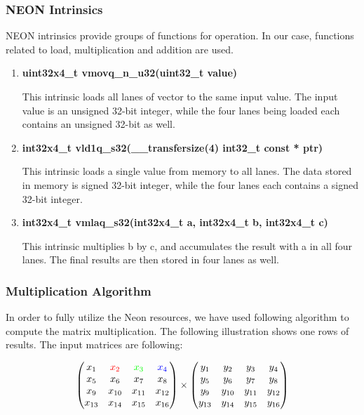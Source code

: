 \subsubsection{NEON Intrinsics}
NEON intrinsics \cite{Intrinsics} provide groups of functions for operation. 
In our case, functions related to load, multiplication and addition are used. 
\begin{enumerate}
\item \textbf{uint32x4\_t  vmovq\_n\_u32(uint32\_t value)}

This intrinsic loads all lanes of vector to the same input value. 
The input value is an unsigned 32-bit integer, 
while the four lanes being loaded each contains an unsigned 32-bit as well.


\item \textbf{int32x4\_t   vld1q\_s32(\_\_transfersize(4) int32\_t const * ptr)}

This intrinsic loads a single value from memory to all lanes.
The data stored in memory is signed 32-bit integer, 
while the four lanes each contains a signed 32-bit integer.

\item \textbf{int32x4\_t   vmlaq\_s32(int32x4\_t a, int32x4\_t b, int32x4\_t c)}

This intrinsic multiplies b by c, and accumulates the result with a in all four lanes.
The final results are then stored in four lanes as well.
\end{enumerate}

\subsubsection{Multiplication Algorithm}

In order to fully utilize the Neon resources, we have used following algorithm to compute the matrix multiplication. The following illustration shows one rows of results.
The input matrices are following:

$$
\begin{pmatrix}
 x_{1} 	& \color{red}{x_{2}} 	& \color{green}{x_{3}}	& \color{blue}{x_{4}}\\
 x_{5} 	& x_{6} 				& x_{7}					& x_{8}\\
 x_{9} 	& x_{10} 				& x_{11}				& x_{12}\\
 x_{13} & x_{14} 				& x_{15}				& x_{16}\\
\end{pmatrix}
\times
\begin{pmatrix}
y_{1} 	& y_{2} 	& y_{3} 	& y_{4} 	\\
y_{5} 	& y_{6} 	& y_{7} 	& y_{8} 	\\
y_{9} 	& y_{10} 	& y_{11} 	& y_{12} 	\\
y_{13}	& y_{14} 	& y_{15} 	& y_{16} 	\\
\end{pmatrix}
$$


